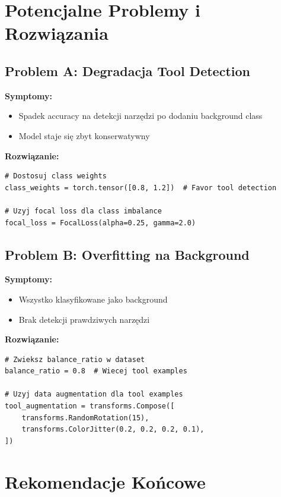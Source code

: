 \documentclass[12pt,a4paper]{article}
\begin{document}
\section{Potencjalne Problemy i Rozwiązania}

\subsection{Problem A: Degradacja Tool Detection}

\textbf{Symptomy:}
\begin{itemize}
    \item Spadek accuracy na detekcji narzędzi po dodaniu background class
    \item Model staje się zbyt konserwatywny
\end{itemize}

\textbf{Rozwiązanie:}
\begin{lstlisting}[caption={Dostosowanie class weights},label={lst:class_weights}]
# Dostosuj class weights
class_weights = torch.tensor([0.8, 1.2])  # Favor tool detection

# Uzyj focal loss dla class imbalance
focal_loss = FocalLoss(alpha=0.25, gamma=2.0)
\end{lstlisting}

\subsection{Problem B: Overfitting na Background}

\textbf{Symptomy:}
\begin{itemize}
    \item Wszystko klasyfikowane jako background
    \item Brak detekcji prawdziwych narzędzi
\end{itemize}

\textbf{Rozwiązanie:}
\begin{lstlisting}[caption={Zwiększenie balance ratio},label={lst:balance_ratio}]
# Zwieksz balance_ratio w dataset
balance_ratio = 0.8  # Wiecej tool examples

# Uzyj data augmentation dla tool examples
tool_augmentation = transforms.Compose([
    transforms.RandomRotation(15),
    transforms.ColorJitter(0.2, 0.2, 0.2, 0.1),
])
\end{lstlisting}

\section{Rekomendacje Końcowe}
\end{document}
